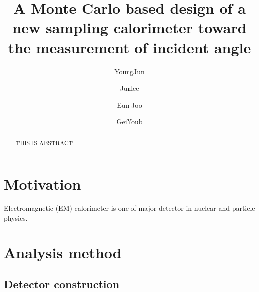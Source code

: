 \documentclass[jkps,preprint,fleqn,showpacs,showkeys]{revtex4}
\begin{document}
\setcounter{page}{0}
\title[]{ A Monte Carlo based design of a new sampling calorimeter toward the measurement of incident angle }

\author{YoungJun }
\author{Junlee }
\author{Eun-Joo }
\author{GeiYoub  }


\begin{abstract}
THIS IS ABSTRACT

\end{abstract}


\maketitle

\section{Motivation}
\label{sec:mot}
Electromagnetic (EM) calorimeter is one of major detector in nuclear and particle physics. 


\section{Analysis method}
\label{sec:ana}
\subsection{Detector construction}
\end{document}
